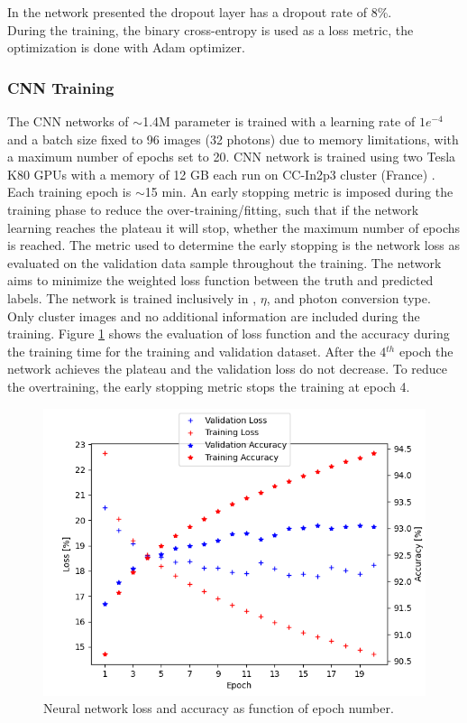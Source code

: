 In the network presented the dropout layer has a dropout rate of 8\%.\\
During the training, the binary cross-entropy is used as a loss metric, the optimization is done with Adam optimizer.

\subsubsection{CNN Training}
\label{gamma:CNN:Training}
The CNN networks of $\sim$1.4M parameter is trained with a learning rate of $1e^{-4}$ and a batch size fixed to 96 images (32 photons) due to memory limitations, with a maximum number of epochs set to 20. CNN network is trained using two Tesla K80 GPUs with a memory of 12 GB each run on CC-In2p3 cluster (France) \cite{cca}. Each training epoch is $\sim$15 min. An early stopping metric \cite{early} is imposed during the training phase to reduce the over-training/fitting, such that if the network learning reaches the plateau it will stop, whether the maximum number of epochs is reached. The metric used to determine the early stopping is the network loss as evaluated on the validation data sample throughout the training. The network aims to minimize the weighted loss function between the truth and predicted labels.
The network is trained inclusively in \eT, $\eta$, and photon conversion type. Only cluster images and no additional information are included during the training.
Figure \ref{fig:gamma:CNN:Training:loss} shows the evaluation of loss function and the accuracy during the training time for the training and validation dataset. After the 4$^{th}$ epoch the network achieves the plateau and the validation loss do not decrease. To reduce the overtraining, the early stopping metric stops the training at epoch 4.
\begin{figure}[htbp]
    \centering
    \includegraphics[width=.7\textwidth]{Ch3/Img/CNN_Loss_Accuracy.png}
    \begin{tcolorbox}[colback=black!5!white,colframe=white!75!black]
    \caption{Neural network loss and accuracy as function of epoch number.}
    \label{fig:gamma:CNN:Training:loss}
    \end{tcolorbox}
    
\end{figure}

